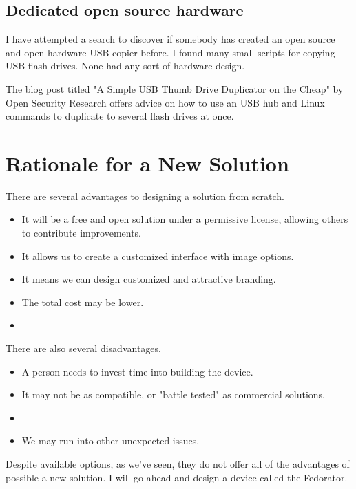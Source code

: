         \subsection{Dedicated open source hardware}
            I have attempted a search to discover if somebody has created an open source and open hardware USB copier before.  I found many small scripts for copying USB flash drives\cite{github-usbmk}\cite{github-auc-automaticly-usb-copier}\cite{github-udev_serialcopier}.  None had any sort of hardware design.
            
            The blog post titled "A Simple USB Thumb Drive Duplicator on the Cheap" by Open Security Research\cite{open-security-research-simple-duplicator} offers advice on how to use an USB hub and Linux commands to duplicate to several flash drives at once. 
            
    \section{Rationale for a New Solution}
        There are several advantages to designing a solution from scratch.
        
        \begin{itemize}
            \item It will be a free and open solution under a permissive license, allowing others to contribute improvements.
            \item It allows us to create a customized interface with image options.
            \item It means we can design customized and attractive branding.
            \item The total cost may be lower.
            \item {}
        \end{itemize}
        
        There are also several disadvantages. 
        \begin{itemize}
            \item A person needs to invest time into building the device.
            \item It may not be as compatible, or "battle tested" as commercial solutions.
            \item {}
            \item We may run into other unexpected issues.
        \end{itemize}
        
        Despite available options, as we've seen, they do not offer all of the advantages of possible a new solution.  I will go ahead and design a device called the Fedorator.
